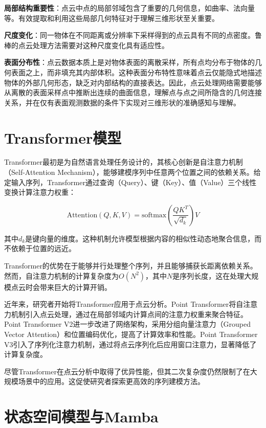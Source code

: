 \documentclass[12pt,a4paper,openany,oneside]{ctexbook}
\theoremstyle{definition}
\theoremstyle{remark}
\begin{document}
\textbf{局部结构重要性}：点云中点的局部邻域包含了重要的几何信息，如曲率、法向量等。有效提取和利用这些局部几何特征对于理解三维形状至关重要。

\textbf{尺度变化}：同一物体在不同距离或分辨率下采样得到的点云具有不同的点密度。鲁棒的点云处理方法需要对这种尺度变化具有适应性。

\textbf{表面分布性}：点云数据本质上是对物体表面的离散采样，所有点均分布于物体的几何表面之上，而非填充其内部体积。这种表面分布特性意味着点云仅能隐式地描述物体的外部几何形态，缺乏对内部结构的直接表达。因此，点云处理网络需要能够从离散的表面采样点中推断出连续的曲面信息，理解点与点之间所隐含的几何连接关系，并在仅有表面观测数据的条件下实现对三维形状的准确感知与理解。
\section{Transformer模型}

Transformer\cite{vaswani2017attention}最初是为自然语言处理任务设计的，其核心创新是自注意力机制（Self-Attention Mechanism），能够建模序列中任意两个位置之间的依赖关系。给定输入序列，Transformer通过查询（Query）、键（Key）、值（Value）三个线性变换计算注意力权重：

\begin{equation}
\text{Attention}(Q, K, V) = \text{softmax}\left(\frac{QK^T}{\sqrt{d_k}}\right)V
\end{equation}

其中$d_k$是键向量的维度。这种机制允许模型根据内容的相似性动态地聚合信息，而不依赖于位置的远近。

Transformer的优势在于能够并行处理整个序列，并且能够捕获长距离依赖关系。然而，自注意力机制的计算复杂度为$O(N^2)$，其中$N$是序列长度，这在处理大规模点云时会带来巨大的计算开销。

近年来，研究者开始将Transformer应用于点云分析。Point Transformer\cite{zhao2021point}将自注意力机制引入点云处理，通过在局部邻域内计算点间的注意力权重来聚合特征。Point Transformer V2\cite{wu2022point}进一步改进了网络架构，采用分组向量注意力（Grouped Vector Attention）和位置编码优化，提高了计算效率和性能。Point Transformer V3\cite{wu2024point}引入了序列化注意力机制，通过将点云序列化后应用窗口注意力，显著降低了计算复杂度。

尽管Transformer在点云分析中取得了优异性能，但其二次复杂度仍然限制了在大规模场景中的应用。这促使研究者探索更高效的序列建模方法。

\section{状态空间模型与Mamba}
\end{document}
